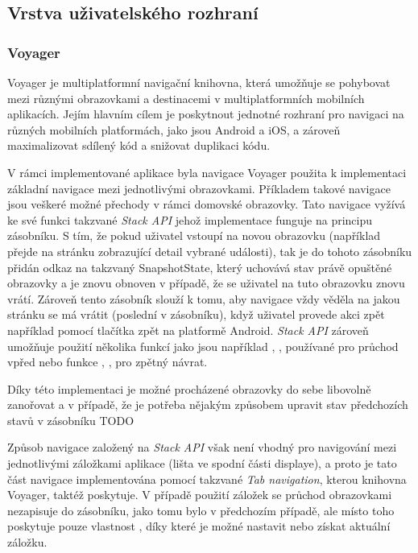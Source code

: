 \subsection{Vrstva uživatelského rozhraní}

\subsubsection*{Voyager}
Voyager je multiplatformní navigační knihovna, která umožňuje se pohybovat mezi různými obrazovkami a destinacemi v multiplatformních mobilních
 aplikacích. \cite{voyager} Jejím hlavním cílem je poskytnout jednotné rozhraní pro navigaci na různých mobilních platformách, jako 
 jsou Android a iOS, a zároveň maximalizovat sdílený kód a snižovat duplikaci kódu.

 V rámci implementované aplikace byla navigace Voyager použita k implementaci základní navigace mezi jednotlivými obrazovkami.
 Příkladem takové navigace jsou veškeré možné přechody v rámci domovské obrazovky. Tato navigace vyžívá ke své funkci takzvané 
 \textit{Stack API} jehož implementace funguje na principu zásobníku. S tím, že pokud uživatel vstoupí na novou obrazovku 
 (například přejde na stránku zobrazující detail vybrané události), tak je do tohoto zásobníku přidán odkaz na takzvaný SnapshotState,
 který uchovává stav právě opuštěné obrazovky a je znovu obnoven v případě, že se uživatel na tuto obrazovku znovu vrátí. Zároveň tento
 zásobník slouží k tomu, aby navigace vždy věděla na jakou stránku se má vrátit (poslední v zásobníku), když uživatel provede akci zpět
 například pomocí tlačítka zpět na platformě Android. \textit{Stack API} zároveň umožňuje použití několika funkcí jako jsou například 
 , ,  používané pro průchod vpřed nebo funkce , , 
  pro zpětný návrat. 

 Díky této implementaci je možné procházené obrazovky do sebe libovolně zanořovat a v případě, že je potřeba nějakým způsobem upravit
 stav předchozích stavů v zásobníku TODO

 Způsob navigace založený na \textit{Stack API} však není vhodný pro navigování mezi jednotlivými záložkami aplikace (lišta ve spodní 
 části displaye), a proto je tato část navigace implementována pomocí takzvané \textit{Tab navigation}, kterou knihovna Voyager, taktéž poskytuje.
 V případě použití záložek se průchod obrazovkami nezapisuje do zásobníku, jako tomu bylo v předchozím případě, ale místo toho poskytuje pouze vlastnost 
 , díky které je možné nastavit nebo získat aktuální záložku. \cite{voyagerTabNav} 
 
